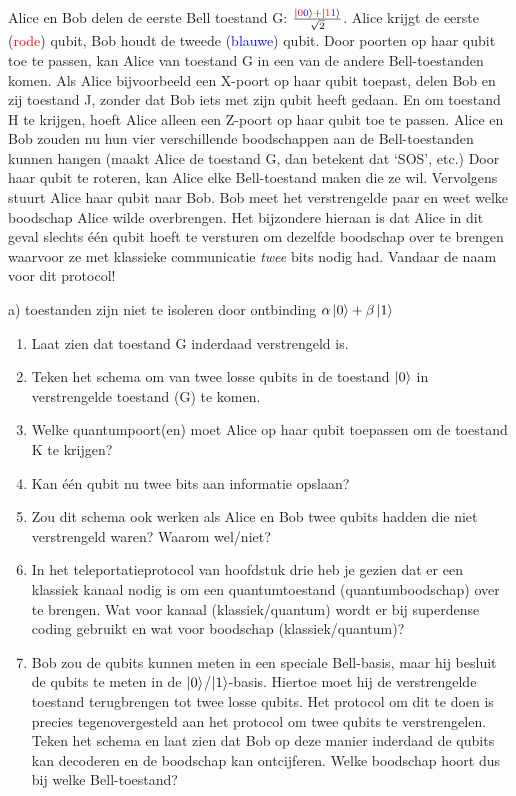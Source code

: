 \documentclass[../../main.tex]{subfiles}
\begin{document}
Alice en Bob delen de eerste Bell toestand G: $\frac{\ket{\textcolor{red}{0}\textcolor{blue}{0}}+\ket{\textcolor{red}{1}\textcolor{blue}{1}}}{\sqrt{2}}$. Alice krijgt de eerste (\textcolor{red}{rode}) qubit, Bob houdt de tweede (\textcolor{blue}{blauwe}) qubit. Door poorten op haar qubit toe te passen, kan Alice van toestand G in een van de andere Bell-toestanden komen. Als Alice bijvoorbeeld een X-poort op haar qubit toepast, delen Bob en zij toestand J, zonder dat Bob iets met zijn qubit heeft gedaan. En om toestand H te krijgen, hoeft Alice alleen een Z-poort op haar qubit toe te passen. Alice en Bob zouden nu hun vier verschillende boodschappen aan de Bell-toestanden kunnen hangen (maakt Alice de toestand G, dan betekent dat `SOS', etc.) Door haar qubit te roteren, kan Alice elke Bell-toestand maken die ze wil. Vervolgens stuurt Alice haar qubit naar Bob. Bob meet het verstrengelde paar en weet welke boodschap Alice wilde overbrengen. Het bijzondere hieraan is dat Alice in dit geval slechts \'{e}\'{e}n qubit hoeft te versturen om dezelfde boodschap over te brengen waarvoor ze met klassieke communicatie \emph{twee} bits nodig had. Vandaar de naam voor dit protocol!

\begin{antwoord}
a) toestanden zijn niet te isoleren door ontbinding $\alpha\ket{0}+\beta\ket{1}$\\
\end{antwoord}
\begin{opdrachtlang}
\begin{enumerate}
\item Laat zien dat toestand G inderdaad verstrengeld is.
\item Teken het schema om van twee losse qubits in de toestand $\ket{0}$ in verstrengelde toestand (G) te komen.
\item Welke quantumpoort(en) moet Alice op haar qubit toepassen om de toestand K te krijgen?
\item Kan \'e\'en qubit nu twee bits aan informatie opslaan?
\item Zou dit schema ook werken als Alice en Bob twee qubits hadden die niet verstrengeld waren? Waarom wel/niet?
\item In het teleportatieprotocol van hoofdstuk drie heb je gezien dat er een klassiek kanaal nodig is om een quantumtoestand (quantumboodschap) over te brengen. Wat voor kanaal (klassiek/quantum) wordt er bij superdense coding gebruikt en wat voor boodschap (klassiek/quantum)?
\item Bob zou de qubits kunnen meten in een speciale Bell-basis, maar hij besluit de qubits te meten in de $\ket{0}$/$\ket{1}$-basis. Hiertoe moet hij de verstrengelde toestand terugbrengen tot twee losse qubits. Het protocol om dit te doen is precies tegenovergesteld aan het protocol om twee qubits te verstrengelen. Teken het schema en laat zien dat Bob op deze manier inderdaad de qubits kan decoderen en de boodschap kan ontcijferen. Welke boodschap hoort dus bij welke Bell-toestand?
\end{enumerate}
\end{opdrachtlang}
\end{document}

